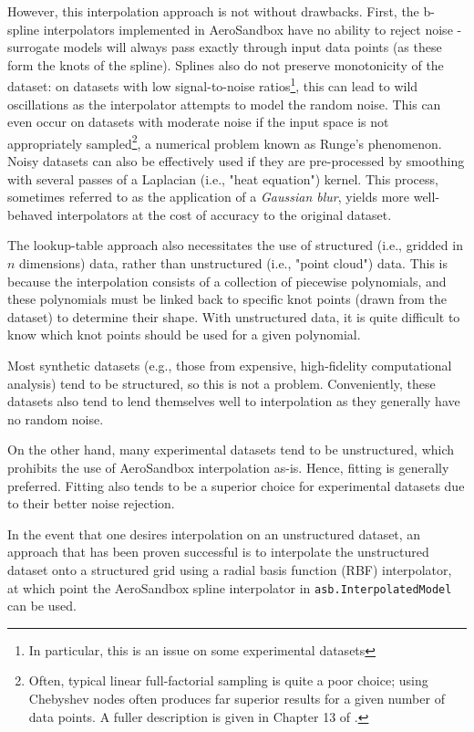 However, this interpolation approach is not without drawbacks. First, the b-spline interpolators implemented in AeroSandbox have no ability to reject noise - surrogate models will always pass exactly through input data points (as these form the knots of the spline). Splines also do not preserve monotonicity of the dataset: on datasets with low signal-to-noise ratios\footnote{In particular, this is an issue on some experimental datasets}, this can lead to wild oscillations as the interpolator attempts to model the random noise. This can even occur on datasets with moderate noise if the input space is not appropriately sampled\footnote{Often, typical linear full-factorial sampling is quite a poor choice; using Chebyshev nodes often produces far superior results for a given number of data points. A fuller description is given in Chapter 13 of \cite{koch2019}.}, a numerical problem known as Runge's phenomenon. Noisy datasets can also be effectively used if they are pre-processed by smoothing with several passes of a Laplacian (i.e., "heat equation") kernel. This process, sometimes referred to as the application of a \textit{Gaussian blur}, yields more well-behaved interpolators at the cost of accuracy to the original dataset.

The lookup-table approach also necessitates the use of structured (i.e., gridded in $n$ dimensions) data, rather than unstructured (i.e., "point cloud") data. This is because the interpolation consists of a collection of piecewise polynomials, and these polynomials must be linked back to specific knot points (drawn from the dataset) to determine their shape. With unstructured data, it is quite difficult to know which knot points should be used for a given polynomial.

Most synthetic datasets (e.g., those from expensive, high-fidelity computational analysis) tend to be structured, so this is not a problem. Conveniently, these datasets also tend to lend themselves well to interpolation as they generally have no random noise.

On the other hand, many experimental datasets tend to be unstructured, which prohibits the use of AeroSandbox interpolation as-is. Hence, fitting is generally preferred. Fitting also tends to be a superior choice for experimental datasets due to their better noise rejection.

In the event that one desires interpolation on an unstructured dataset, an approach that has been proven successful is to interpolate the unstructured dataset onto a structured grid using a radial basis function (RBF) interpolator, at which point the AeroSandbox spline interpolator in \texttt{asb.InterpolatedModel} can be used.